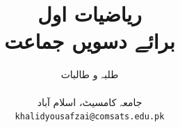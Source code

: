 \documentclass[leqno,b5paper]{book}
\author{
طلبہ و طالبات\\
\\
{\small {جامعہ کامسیٹ، اسلام آباد}}\\
\texttt{khalidyousafzai@comsats.edu.pk}
}
\title{{ریاضیات اول}\small\\ {برائے دسویں  جماعت}}
\date{}                           %
\begin{document}
\sloppy


\renewcommand*{\contentsname}{عنوان}    %
\renewcommand*{\proofname}{ثبوت}   %
\renewcommand*{\appendixname}{ضمیمہ}


\frontmatter                          %

\maketitle

\tableofcontents
\pagestyle{empty}

\newpage


%


\mainmatter                      %
\renewcommand*{\chaptername}{باب}

\pagestyle{headings}


















%



\end{document}
